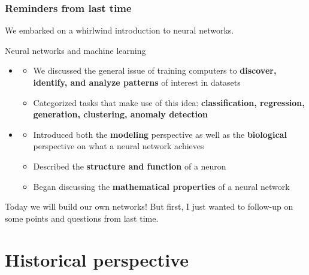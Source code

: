\documentclass[hyperref={colorlinks=true}]{beamer}
\begin{document}
\begin{frame}%
  \frametitle{Reminders from last time}

  We embarked on a whirlwind introduction to neural networks.
  
  \vspace{0.3cm}
  
  \begin{ucblock}{Neural networks and machine learning}
    \begin{itemize}
      \item {} 
      \begin{itemize}
        \item We discussed the general issue of training computers to \textbf{discover, identify, and analyze patterns} of interest in datasets
        \item Categorized tasks that make use of this idea: \textbf{classification, regression, generation, clustering, anomaly detection}
      \end{itemize}
      \item {} 
      \begin{itemize}
        \item Introduced both the \textbf{modeling} perspective as well as the \textbf{biological} perspective on what a neural network achieves 
        \item Described the \textbf{structure and function} of a neuron
        \item Began discussing the \textbf{mathematical properties} of a neural network
      \end{itemize}
    \end{itemize}
  \end{ucblock}
  
  \mysp
  
  Today we will build our own networks! But first, I just wanted to follow-up on some points and questions from last time.

\end{frame}

\section[Historical perspective]{Historical perspective}
\end{document}
